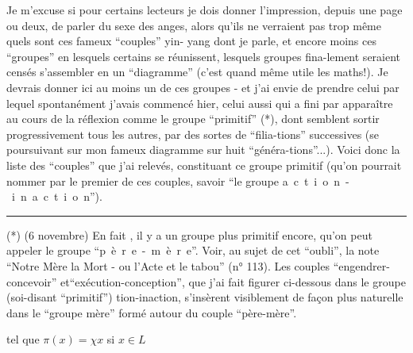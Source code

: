 Je m'excuse si pour certains lecteurs je dois donner l'impression, depuis une page ou deux, de parler du sexe des anges, alors qu'ils ne verraient pas trop même quels sont ces fameux ``couples'' yin- yang dont je parle, et encore moins ces ``groupes'' en lesquels certains se réunissent, lesquels groupes fina-\linebreak lement seraient censés s'assembler en un ``diagramme'' (c'est quand même utile les maths!). Je devrais donner ici au moins un de ces groupes - et j'ai envie de prendre celui par lequel spontanément j'avais commencé hier, celui aussi qui a fini par apparaître au cours de la réflexion comme le groupe ``primitif'' (*), dont semblent sortir progressivement tous les autres, par des sortes de ``filia-\linebreak tions'' successives (se poursuivant sur mon fameux diagramme sur huit ``généra-\linebreak tions''...). Voici donc la liste des ``couples'' que j'ai relevés, constituant ce groupe primitif (qu'on pourrait nommer par le premier de ces couples, savoir ``le groupe \mbox{a c t i o n - i n a c t i o n}'').
\par\noindent\rule{0.25\linewidth}{0.4pt}
(*) (6 novembre) En fait , il y a un groupe plus primitif encore, qu'on peut appeler le groupe ``\mbox{p è r e - m è r e}''. Voir, au sujet de cet ``oubli'', la note ``Notre Mère la Mort - ou l'Acte et le tabou'' (n° 113). Les couples ``engendrer-concevoir'' et``exécution-conception'', que j'ai fait figurer ci-dessous dans le groupe (soi-disant ``primitif'') tion-inaction, s'insèrent visiblement de façon plus naturelle dans le ``groupe mère'' formé autour du couple ``père-mère''.

tel que $\pi(x)=\chi x$ si $x\in L$

